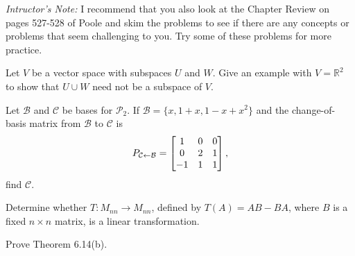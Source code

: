 \documentclass[boxes]{gsypset}
\begin{document}

\noindent
\emph{Intructor's Note:} I recommend that you also look at the Chapter Review on
pages 527-528 of Poole and skim the problems to see if there are any concepts or
problems that seem challenging to you. Try some of these problems for more
practice.

\begin{problem}[6.1.47]
	Let $V$ be a vector space with subspaces $U$ and $W$. Give an
	example with $V=\mathbb{R}^2$ to show that $U \cup W$ need not be a
	subspace of $V$.
\end{problem}
\begin{solution}
	
\end{solution}

\begin{problem}[6.3.16]
	Let $\mathcal{B}$ and $\mathcal{C}$ be bases for $\mathscr{P}_2$. 
	If $\mathcal{B}=\{x,1+x,1-x+x^2\}$ and the change-of-basis matrix from 
	$\mathcal{B}$ to $\mathcal{C}$ is
	\[
		P_{\mathcal{C}\leftarrow\mathcal{B}}=\begin{bmatrix}1&0&0\\0&2&1\\-1&1&1\end{bmatrix},
	\]
	find $\mathcal{C}$.
\end{problem}
\begin{solution}
	
\end{solution}

\begin{problem}[6.4.4]
	Determine whether $T:M_{nn}\to M_{nn}$, defined by $T(A)=AB-BA$,
	where $B$ is a fixed $n\times n$ matrix,
	is a linear transformation.
\end{problem}
\begin{solution}
	
\end{solution}

\begin{problem}[6.4.21]
	
	Prove Theorem 6.14(b).
\end{problem}
\begin{solution}
	
\end{solution}
\end{document}

